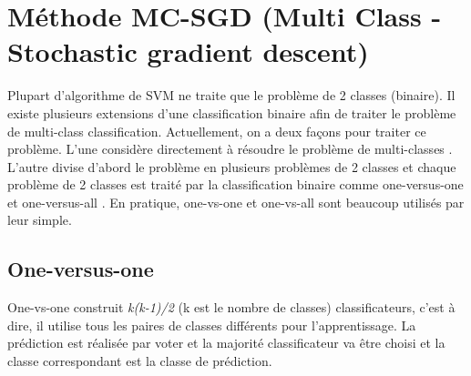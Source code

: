 
\section{Méthode MC-SGD (Multi Class - Stochastic gradient descent)}
Plupart d'algorithme de SVM ne traite que le problème de 2 classes (binaire). Il existe plusieurs extensions d'une classification binaire afin de traiter le problème de multi-class classification. Actuellement, on a deux façons pour traiter ce problème. L'une considère directement à résoudre le problème de multi-classes \cite{ww99}. L'autre divise d'abord le problème en plusieurs problèmes de 2 classes et chaque problème de 2 classes est traité par la classification binaire comme one-versus-one \cite{vv95} et one-versus-all \cite{uk99}. En pratique, one-vs-one et one-vs-all sont beaucoup utilisés par leur simple.\\

\subsection{One-versus-one}
One-vs-one construit \textit{k(k-1)/2} (k est le nombre de classes) classificateurs, c'est à dire, il utilise tous les paires de classes différents pour l'apprentissage. La prédiction est réalisée par voter et la majorité classificateur va être choisi et la classe correspondant est la classe de prédiction. 


